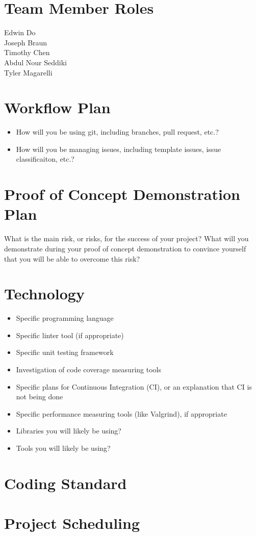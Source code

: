 \documentclass{article}
\begin{document}
\section{Team Member Roles}
Edwin Do
\\ Joseph Braun
\\ Timothy Chen
\\ Abdul Nour Seddiki
\\ Tyler Magarelli


\section{Workflow Plan}

\begin{itemize}
	\item How will you be using git, including branches, pull request, etc.?
	\item How will you be managing issues, including template issues, issue
	classificaiton, etc.?
\end{itemize}

\section{Proof of Concept Demonstration Plan}

What is the main risk, or risks, for the success of your project?  What will you
demonstrate during your proof of concept demonstration to convince yourself that
you will be able to overcome this risk?

\section{Technology}

\begin{itemize}
\item Specific programming language
\item Specific linter tool (if appropriate)
\item Specific unit testing framework
\item Investigation of code coverage measuring tools
\item Specific plans for Continuous Integration (CI), or an explanation that CI
  is not being done
\item Specific performance measuring tools (like Valgrind), if
  appropriate
\item Libraries you will likely be using?
\item Tools you will likely be using?
\end{itemize}

\section{Coding Standard}

\section{Project Scheduling}

\end{document}
